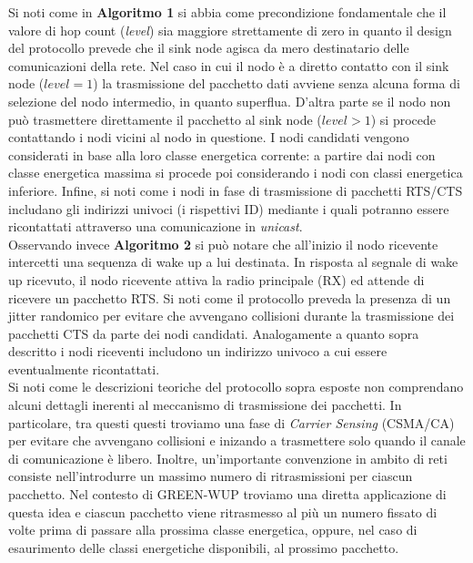 \documentclass[binding=0.6cm,TFA]{sapthesis}
\begin{document}
Si noti come in \textbf{Algoritmo 1} si abbia come precondizione fondamentale che il valore di hop count (\emph{level}) sia maggiore strettamente
di zero in quanto il design del protocollo prevede che il sink node agisca da mero destinatario delle comunicazioni della rete. Nel caso in cui
il nodo è a diretto contatto con il sink node ($level=1$) la trasmissione del pacchetto dati avviene senza alcuna forma di
selezione del nodo intermedio, in quanto superflua. D'altra parte se il nodo non può trasmettere direttamente il pacchetto al sink node ($level>1$)
si procede contattando i nodi vicini al nodo in questione. I nodi candidati vengono considerati in base alla loro classe energetica corrente:
a partire dai nodi con classe energetica massima si procede poi considerando i nodi con classi energetica inferiore. Infine, si noti come i nodi in fase
di trasmissione di pacchetti RTS/CTS includano gli indirizzi univoci (i rispettivi ID) mediante i quali potranno essere ricontattati attraverso una
comunicazione in \emph{unicast}.\\

Osservando invece \textbf{Algoritmo 2} si può notare che all'inizio il nodo ricevente intercetti una sequenza di wake up a lui destinata. In risposta
al segnale di wake up ricevuto, il nodo ricevente attiva la radio principale (RX) ed attende di ricevere un pacchetto RTS. Si noti come il
protocollo preveda la presenza di un jitter randomico per evitare che avvengano collisioni durante la trasmissione dei pacchetti CTS da parte
dei nodi candidati. Analogamente a quanto sopra descritto i nodi riceventi includono un indirizzo univoco a cui essere eventualmente ricontattati.\\

Si noti come le descrizioni teoriche del protocollo sopra esposte non comprendano alcuni dettagli inerenti al meccanismo di trasmissione
dei pacchetti. In particolare, tra questi questi troviamo una fase di \emph{Carrier Sensing} (CSMA/CA) per evitare che avvengano collisioni e
inizando a trasmettere solo quando il canale di comunicazione è libero. Inoltre, un'importante convenzione in ambito di reti consiste
nell'introdurre un massimo numero di ritrasmissioni per ciascun pacchetto. Nel contesto di GREEN-WUP troviamo una diretta applicazione di questa
idea e ciascun pacchetto viene ritrasmesso al più un numero fissato di volte prima di passare alla prossima classe energetica, oppure, nel caso
di esaurimento delle classi energetiche disponibili, al prossimo pacchetto.
\end{document}
